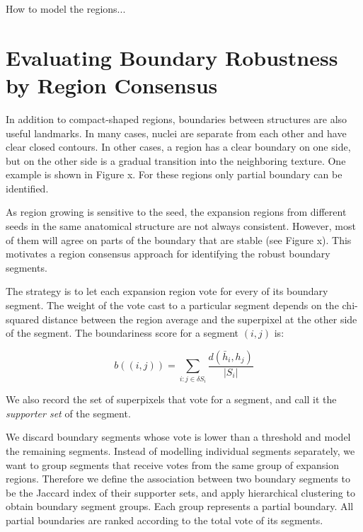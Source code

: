 \documentclass{llncs}
\newcommand{\authcmt}[2]{\textcolor{#1}{#2}}
\newcommand{\yoav}[1]{\authcmt{blue}{[YF: #1]}}
\begin{document}
How to model the regions...

%
 
\section{Evaluating Boundary Robustness by Region Consensus}

In addition to compact-shaped regions, boundaries between structures are also useful landmarks. In many cases, nuclei are separate from each other and have clear closed contours. In other cases, a region has a clear boundary on one side, but on the other side is a gradual transition into the neighboring texture. One example is shown in Figure x. For these regions only partial boundary can be identified.

As region growing is sensitive to the seed, the expansion regions from different seeds in the same anatomical structure are not always consistent. However, most of them will agree on parts of the boundary that are stable (see Figure x). This motivates a region consensus approach for identifying the robust boundary segments.


The strategy is to let each expansion region vote for every of its boundary segment. The weight of the vote cast to a particular segment depends on the chi-squared distance between the region average and the superpixel at the other side of the segment. The boundariness score for a segment $(i,j)$ is:

$$
b((i,j)) = \sum_{i: j\in \delta S_i} \frac{d(\bar{h}_i, h_j)}{|S_i|}
$$

We also record the set of superpixels that vote for a segment, and call it the \textit{supporter set} of the segment.


We discard boundary segments whose vote is lower than a threshold and model the remaining segments. Instead of modelling individual segments separately, we want to group segments that receive votes from the same group of expansion regions. Therefore we define the association between two boundary segments to be the Jaccard index of their supporter sets, and apply hierarchical clustering to obtain boundary segment groups. Each group represents a partial boundary. All partial boundaries are ranked according to the total vote of its segments.
\end{document}
